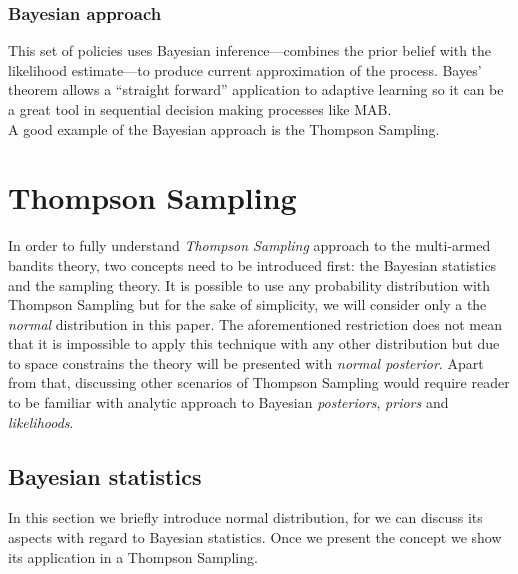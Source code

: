 \documentclass[12pt, a4paper, pdflatex, leqno, twoside]{report}
\begin{document}

\subsubsection{Bayesian approach}
This set of policies uses Bayesian inference---combines the prior belief with the
likelihood estimate---to produce current approximation of the process. 
Bayes' theorem allows a ``straight forward'' application to adaptive learning so it can be a great tool in sequential decision making processes 
like MAB.\\
A good example of the Bayesian approach is the Thompson Sampling. \\








\section{Thompson Sampling\label{sec:thompsonsampling}}
In order to fully understand
\emph{Thompson Sampling} approach to the multi-armed bandits 
theory, two concepts need to be introduced first: the Bayesian statistics and
the sampling theory.
It is possible to use any probability distribution with Thompson Sampling but 
for the sake of simplicity, we will consider only a the \emph{normal} distribution in this 
paper. The aforementioned restriction does not mean that it is impossible to apply this 
technique with any other distribution but due to space constrains the theory 
will be presented with \emph{normal posterior}. Apart from that, discussing other 
scenarios of Thompson Sampling would require reader to be familiar with 
analytic approach to Bayesian \emph{posteriors}, \emph{priors} and 
\emph{likelihoods}.

\subsection{Bayesian statistics\label{sec:bayesian}}
In this section we briefly introduce normal distribution, for we can
discuss its aspects with regard to Bayesian statistics. Once we present the concept we show its application in a Thompson Sampling.\\
\end{document}
